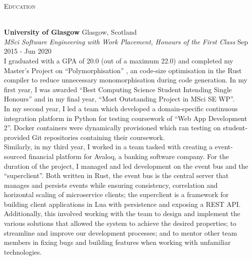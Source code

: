 \documentclass[a4paper]{article}
\newcommand{\lineunder} {
  \vspace*{-8pt} \\
  \hspace*{-18pt} \hrulefill \\
}
\newcommand{\header} [1] {
  {\hspace*{-18pt}\vspace*{6pt} \textsc{#1}}
  \vspace*{-6pt} \lineunder
}
\begin{document}
\header{Education}
\vspace{1mm}

\textbf{University of Glasgow} \hfill {\color{gray} Glasgow, Scotland} \\
\textit{MSci Software Engineering with Work Placement, Honours of the First Class} \hfill {\color{gray} Sep 2015 - Jun 2020} \\
\vspace{2mm}
I graduated with a GPA of 20.0 (out of a maximum 22.0) and completed my Master's Project on
``Polymorphisation'' \footnotemark[1], an code-size optimisation in the Rust compiler to reduce
unnecessary monomorphisation during code generation. In my first year, I was awarded ``Best
Computing Science Student Intending Single Honours'' and in my final year, ``Most Outstanding
Project in MSci SE WP''. \\
\vspace{2mm}
In my second year, I led a team which developed a domain-specific continuous integration platform
in Python for testing coursework of ``Web App Development 2''. Docker containers were dynamically
provisioned which ran testing on student-provided Git repositories containing their coursework. \\
\vspace{2mm}
Similarly, in my third year, I worked in a team tasked with creating a event-sourced financial
platform \footnotemark[2] \footnotemark[3] for Avaloq, a banking software company. For the duration
of the project, I managed and led development on the event bus and the ``superclient''. Both written
in Rust, the event bus is the central server that manages and persists events while ensuring
consistency, correlation and horizontal scaling of microservice clients; the superclient is a
framework for building client applications in Lua with persistence and exposing a REST API. \\
\vspace{2mm}
Additionally, this involved working with the team to design and implement the various solutions that
allowed the system to achieve the desired properties; to streamline and improve our development
processes; and to mentor other team members in fixing bugs and building features when working with
unfamiliar technologies.
\vspace{2mm}
\end{document}
